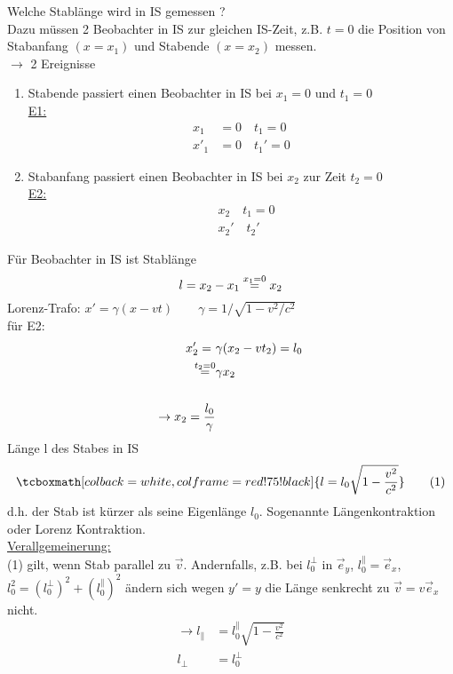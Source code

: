 \documentclass[titlepage,12pt,a4paper,ngerman]{report}
\newcommand{\rmbox}[1]{\tcboxmath[colback=white,colframe=red!75!black]{#1}} %
\begin{document}
{Welche Stablänge wird in IS gemessen ?\\
Dazu müssen 2 Beobachter in IS zur gleichen IS-Zeit, z.B. $ t=0 $ die Position von Stabanfang $ (x=x_1) $ und Stabende $ (x=x_2) $ messen.\\
$ \rightarrow $ 2 Ereignisse
\begin{enumerate}[1)]
	\item Stabende passiert einen Beobachter in IS bei $ x_1 = 0 $ und $ t_1 = 0 $\\
	\underline{E1:}
	\begin{align*}
	x_1 &= 0 \quad t_1 = 0\\
	x'_1 &= 0 \quad t_1' = 0
	\end{align*}
	\item Stabanfang passiert einen Beobachter in IS bei $ x_2 $ zur Zeit $ t_2 = 0 $\\
	\underline{E2:}
	\begin{align*}
	&x_2 \quad t_1 = 0\\
	&x_2' \quad t_2'
	\end{align*}
\end{enumerate}
Für Beobachter in IS ist Stablänge
$$ l = x_2 - x_1 \buildrel x_1 = 0 \over = x_2 $$
Lorenz-Trafo: $ x' = \gamma (x-vt) \qquad \gamma = 1 / \sqrt{1-v^2/c^2} $\\
für E2:
\begin{align*}
x_2' = \  &\gamma (x_2 - v t_2) = l_0 \\
\buildrel t_2 = 0 \over = &\gamma x_2 \\\\
\rightarrow x_2 = \frac{l_0}{\gamma}
\end{align*}
Länge l des Stabes in IS 
\begin{equation*}
\rmbox{l = l_0 \sqrt{1-\frac{v^2}{c^2}}} \tag{1}
\end{equation*}
d.h. der Stab ist kürzer als seine Eigenlänge $ l_0 $. Sogenannte Längenkontraktion oder Lorenz Kontraktion.\\[5pt]
\underline{Verallgemeinerung:}\\
(1) gilt, wenn Stab parallel zu $ \vec{v} $. Andernfalls, z.B. bei $ l_0^\perp $ in $ \vec{e}_y $, $ l_0^\parallel = \vec{e}_x $, $ l_0^2 = (l_0^\perp)^2 + (l_0^\parallel)^2  $ ändern sich wegen $ y' = y $ die Länge senkrecht zu $ \vec{v} = v \vec{e}_x $ nicht.
\begin{align*}
\rightarrow l_{\parallel} &= l_0 ^\parallel \sqrt{1-\frac{v^2}{c^2}}\\
l_{\perp} &= l_0^\perp
\end{align*}
}
\end{document}
